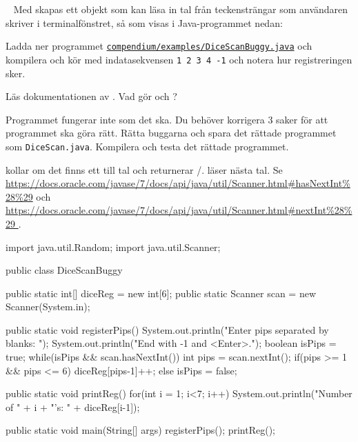 \QUESTEND






\QUESTBEGIN

\Task  \what~  Med  skapas ett objekt som kan läsa in tal från teckensträngar som användaren skriver i terminalfönstret, så som visas i Java-programmet nedan:

Ladda ner programmet   \href{https://raw.githubusercontent.com/lunduniversity/introprog/master/compendium/examples/DiceReg.java}{\texttt{compendium/examples/DiceScanBuggy.java}}
och kompilera och kör med indatasekvensen \texttt{1 2 3 4 -1} och notera hur registreringen sker.

\Subtask Läs dokumentationen av . Vad gör  och ?


\Subtask Programmet fungerar inte som det ska. Du behöver korrigera 3 saker för att programmet ska göra rätt. Rätta buggarna och spara det rättade programmet som \texttt{DiceScan.java}. Kompilera och testa det rättade programmet.

\SOLUTION

\TaskSolved \what

\SubtaskSolved

 kollar om det finns ett till tal och returnerar /.  läser nästa tal.
Se \url{https://docs.oracle.com/javase/7/docs/api/java/util/Scanner.html#hasNextInt%28%29} och \url{https://docs.oracle.com/javase/7/docs/api/java/util/Scanner.html#nextInt%28%29 }.

\SubtaskSolved

\begin{Code}[language=Java,numbers=left]
import java.util.Random;
import java.util.Scanner;

public class DiceScanBuggy {
	public static int[] diceReg = new int[6];
	public static Scanner scan = new Scanner(System.in);

	public static void registerPips() {
		System.out.println("Enter pips separated by blanks: ");
		System.out.println("End with -1 and <Enter>.");
		boolean isPips = true;
		while(isPips && scan.hasNextInt()){
			int pips = scan.nextInt();
			if(pips >= 1 && pips <= 6) {
				diceReg[pips-1]++;
			} else {
				isPips = false;
			}
		}
	}

	public static void printReg(){
		for(int i = 1; i<7; i++) {
		System.out.println("Number of " + i + "'s: " + diceReg[i-1]);
		}
	}

	public static void main(String[] args) {
		registerPips();
		printReg();
	}
}
\end{Code}

\QUESTEND
